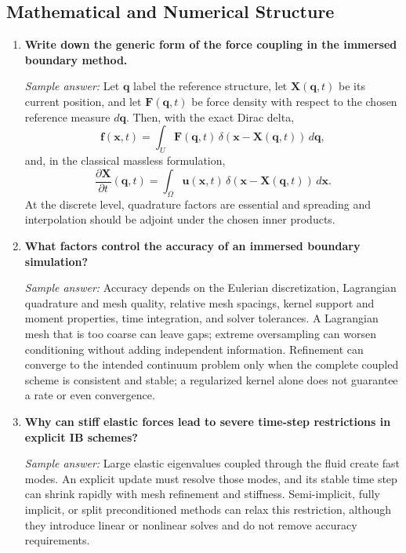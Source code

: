 \documentclass[12pt]{article}
\begin{document}
\subsection*{Mathematical and Numerical Structure}

\begin{enumerate}[resume]
\item \textbf{Write down the generic form of the force coupling in the immersed boundary method.}

\textit{Sample answer:}
Let $\mathbf{q}$ label the reference structure, let
$\mathbf{X}(\mathbf{q},t)$ be its current position, and let
$\mathbf{F}(\mathbf{q},t)$ be force density with respect to the chosen
reference measure $d\mathbf{q}$. Then, with the exact Dirac delta,
\[
\mathbf{f}(\mathbf{x},t) = \int_U \mathbf{F}(\mathbf{q},t)\,
\delta\!\left(\mathbf{x}-\mathbf{X}(\mathbf{q},t)\right)\,d\mathbf{q},
\]
and, in the classical massless formulation,
\[
\frac{\partial\mathbf{X}}{\partial t}(\mathbf{q},t)
= \int_\Omega \mathbf{u}(\mathbf{x},t)\,
\delta\!\left(\mathbf{x}-\mathbf{X}(\mathbf{q},t)\right)\,d\mathbf{x}.
\]
At the discrete level, quadrature factors are essential and spreading and
interpolation should be adjoint under the chosen inner products.

\item \textbf{What factors control the accuracy of an immersed boundary simulation?}

\textit{Sample answer:}
Accuracy depends on the Eulerian discretization, Lagrangian quadrature and mesh
quality, relative mesh spacings, kernel support and moment properties, time
integration, and solver tolerances. A Lagrangian mesh that is too coarse can
leave gaps; extreme oversampling can worsen conditioning without adding
independent information. Refinement can converge to the intended continuum
problem only when the complete coupled scheme is consistent and stable; a
regularized kernel alone does not guarantee a rate or even convergence.

\item \textbf{Why can stiff elastic forces lead to severe time-step restrictions in explicit IB schemes?}

\textit{Sample answer:}
Large elastic eigenvalues coupled through the fluid create fast modes. An
explicit update must resolve those modes, and its stable time step can shrink
rapidly with mesh refinement and stiffness. Semi-implicit, fully implicit, or
split preconditioned methods can relax this restriction, although they introduce
linear or nonlinear solves and do not remove accuracy requirements.
\end{enumerate}
\end{document}
